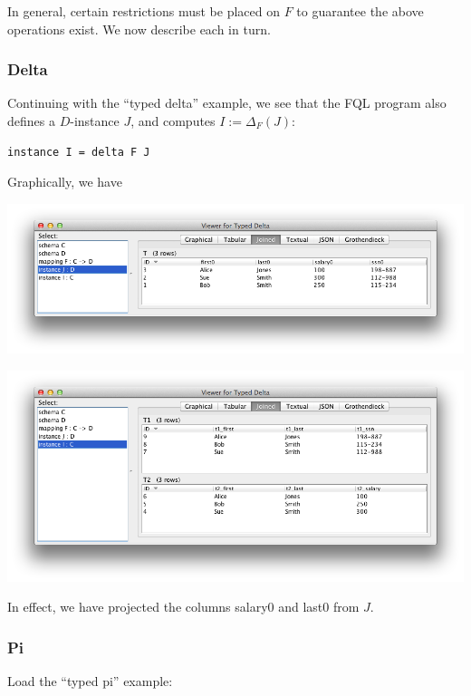 \documentclass[12pt]{article}
\begin{document}
In general, certain restrictions must be placed on $F$ to guarantee the above operations exist. We now describe each in turn.  

\subsubsection{Delta}

Continuing with the ``typed delta'' example, we see that the FQL program also defines a $D$-instance $J$, and computes $I := \Delta_F(J)$:

\begin{verbatim}
instance I = delta F J
\end{verbatim}

Graphically, we have

\begin{center}
\includegraphics[width=6in]{deltaJ}

\includegraphics[width=6in]{deltaI}
\end{center}

In effect, we have projected the columns salary0 and last0 from $J$.  

\subsubsection{Pi}

Load the ``typed pi'' example:
\end{document}
